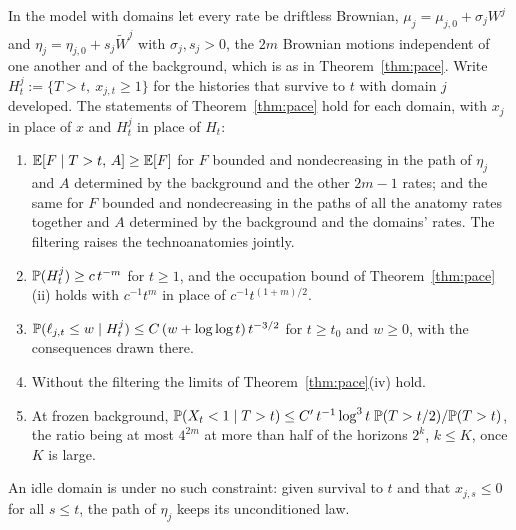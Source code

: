 \begin{theorem}\label{thm:pacedomains}
In the model with domains let every rate be driftless Brownian,
$\mu_j=\mu_{j,0}+\sigma_jW^j$ and $\eta_j=\eta_{j,0}+s_j\widetilde W^j$
with $\sigma_j,s_j>0$, the $2m$ Brownian motions independent of one
another and of the background, which is as in Theorem~\ref{thm:pace}.
Write $H^j_t:=\{T>t,\ x_{j,t}\ge1\}$ for the histories that survive to $t$
with domain $j$ developed. The statements of Theorem~\ref{thm:pace} hold
for each domain, with $x_j$ in place of $x$ and $H^j_t$ in place of $H_t$:
\begin{enumerate}[label=\emph{(\roman*)},itemsep=1pt]
\item $\mathbb{E}[F\mid T>t,\,A]\ge\mathbb{E}[F]$ for $F$ bounded and nondecreasing in the
path of $\eta_j$ and $A$ determined by the background and the other
$2m-1$ rates; and the same for $F$ bounded and nondecreasing in the paths
of all the anatomy rates together and $A$ determined by the background
and the domains' rates. The filtering raises the technoanatomies jointly.
\item $\mathbb{P}(H^j_t)\ge c\,t^{-m}$ for $t\ge1$, and the occupation bound of
Theorem~\ref{thm:pace}(ii) holds with $c^{-1}t^{m}$ in place of
$c^{-1}t^{(1+m)/2}$.
\item $\mathbb{P}(\ell_{j,t}\le w\mid H^j_t)\le C\,(w+\log\log t)\,t^{-3/2}$ for
$t\ge t_0$ and $w\ge0$, with the consequences drawn there.
\item Without the filtering the limits of Theorem~\ref{thm:pace}(iv)
hold.
\item At frozen background,
$\mathbb{P}(X_t<1\mid T>t)\le C'\,t^{-1}\log^3t\;\mathbb{P}(T>t/2)/\mathbb{P}(T>t)$, the ratio
being at most $4^{2m}$ at more than half of the horizons $2^k$, $k\le K$,
once $K$ is large.
\end{enumerate}
An idle domain is under no such constraint: given survival to $t$ and
that $x_{j,s}\le0$ for all $s\le t$, the path of $\eta_j$ keeps its
unconditioned law.
\end{theorem}

